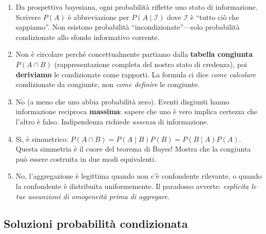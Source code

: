 \documentclass[
  letterpaper,
  DIV=11,
  numbers=noendperiod,
  oneside]{scrreprt}
\theoremstyle{definition}
\theoremstyle{plain}
\theoremstyle{definition}
\theoremstyle{remark}
\begin{document}
\begin{tcolorbox}
\begin{enumerate}
\def\labelenumi{\arabic{enumi}.}
\item
  Da prospettiva bayesiana, ogni probabilità riflette uno stato di
  informazione. Scrivere \(P(A)\) è abbreviazione per
  \(P(A \mid \mathcal{I})\) dove \(\mathcal{I}\) è ``tutto ciò che
  sappiamo''. Non esistono probabilità ``incondizionate''---solo
  probabilità condizionate allo sfondo informativo corrente.
\item
  Non è circolare perché concettualmente partiamo dalla \textbf{tabella
  congiunta} \(P(A \cap B)\) (rappresentazione completa del nostro stato
  di credenza), poi \textbf{deriviamo} le condizionate come rapporti. La
  formula ci dice \emph{come calcolare} condizionate da congiunte, non
  \emph{come definire} le congiunte.
\item
  No (a meno che uno abbia probabilità zero). Eventi disgiunti hanno
  informazione reciproca \textbf{massima}: sapere che uno è vero implica
  certezza che l'altro è falso. Indipendenza richiede \emph{assenza} di
  informazione.
\item
  Sì, è simmetrico:
  \(P(A \cap B) = P(A \mid B) P(B) = P(B \mid A) P(A)\). Questa
  simmetria è il cuore del teorema di Bayes! Mostra che la congiunta può
  essere costruita in due modi equivalenti.
\item
  No, l'aggregazione è legittima quando non c'è confondente rilevante, o
  quando la confondente è distribuita uniformemente. Il paradosso
  avverte: \emph{esplicita le tue assunzioni di omogeneità prima di
  aggregare}.
\end{enumerate}

\subsection{Soluzioni probabilità
condizionata}\label{soluzioni-probabilituxe0-condizionata}


\end{tcolorbox}
\end{document}
